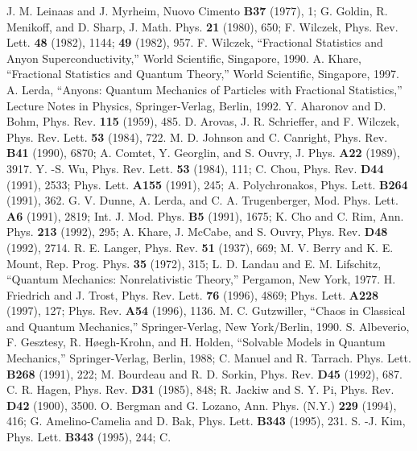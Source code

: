 \documentclass[a4paper,aps,eqsecnum,preprint,preprintnumbers,12pt]{revtex4}
\begin{document}
\begin{thebibliography}{12345}
 J. M. Leinaas and J. Myrheim, Nuovo Cimento
{\bf B37} (1977), 1; G. Goldin, R. Menikoff, and D. Sharp, J.
Math. Phys. {\bf 21} (1980), 650; F. Wilczek, Phys. Rev. Lett.
{\bf 48} (1982), 1144; {\bf 49} (1982), 957.
 F. Wilczek, ``Fractional Statistics and
Anyon Superconductivity,'' World Scientific, Singapore, 1990.
 A. Khare, ``Fractional Statistics and Quantum
Theory,'' World Scientific, Singapore, 1997.
 A. Lerda, ``Anyons: Quantum Mechanics of Particles
with Fractional Statistics,'' Lecture Notes in Physics,
Springer-Verlag, Berlin, 1992.
 Y. Aharonov and D. Bohm, Phys. Rev. {\bf 115}
(1959), 485.
 D. Arovas, J. R. Schrieffer, and F. Wilczek,
Phys. Rev. Lett. {\bf 53} (1984), 722.
 M. D. Johnson and C. Canright, Phys. Rev. {\bf
B41} (1990), 6870; A. Comtet, Y. Georglin, and S. Ouvry, J. Phys.
{\bf A22} (1989), 3917.
 Y. -S. Wu, Phys. Rev. Lett. {\bf 53} (1984), 111; C.
Chou, Phys. Rev. {\bf D44} (1991), 2533; Phys. Lett. {\bf A155}
(1991), 245; A. Polychronakos, Phys. Lett. {\bf B264} (1991), 362.
 G. V. Dunne, A. Lerda, and C. A. Trugenberger,
Mod. Phys. Lett. {\bf A6} (1991), 2819; Int. J. Mod. Phys. {\bf
B5} (1991), 1675; K. Cho and C. Rim, Ann. Phys. {\bf 213} (1992),
295; A. Khare, J. McCabe, and S. Ouvry, Phys. Rev. {\bf D48}
(1992), 2714.
 R. E. Langer, Phys. Rev. {\bf 51} (1937), 669; M.
V. Berry and K. E. Mount, Rep. Prog. Phys. {\bf 35} (1972), 315;
L. D. Landau and E. M. Lifschitz, ``Quantum Mechanics:
Nonrelativistic Theory,'' Pergamon, New York, 1977.
 H. Friedrich and J. Trost, Phys. Rev. Lett.
{\bf 76} (1996), 4869; Phys. Lett. {\bf A228} (1997), 127; Phys.
Rev. {\bf A54} (1996), 1136.
 M. C. Gutzwiller, ``Chaos in Classical and
Quantum Mechanics,'' Springer-Verlag, New York/Berlin, 1990.
 S. Albeverio, F. Gesztesy, R. H\o egh-Krohn,
and H. Holden, ``Solvable Models in Quantum Mechanics,''
Springer-Verlag, Berlin, 1988; C. Manuel and R. Tarrach. Phys.
Lett. {\bf B268} (1991), 222; M. Bourdeau and R. D. Sorkin, Phys.
Rev. {\bf D45} (1992), 687.
 C. R. Hagen, Phys. Rev. {\bf D31} (1985), 848; R.
Jackiw and S. Y. Pi, Phys. Rev. {\bf D42} (1900), 3500.
 O. Bergman and G. Lozano, Ann. Phys. (N.Y.) {\bf
229} (1994), 416; G. Amelino-Camelia and D. Bak, Phys. Lett. {\bf
B343} (1995), 231.
 S. -J. Kim, Phys. Lett. {\bf B343} (1995), 244; C.

\end{thebibliography}
\end{document}
